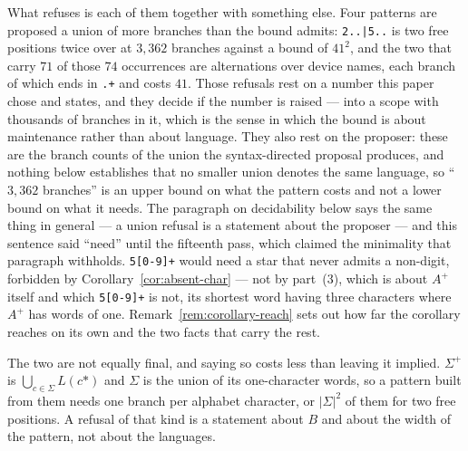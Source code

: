 What refuses is each of them together with something else. Four patterns are proposed a
union of more
branches than the bound admits: \texttt{2..|5..} is two free positions twice over at
$3{,}362$ branches against a bound of $41^{2}$, and the two that carry $71$ of those
$74$ occurrences are alternations over device names, each branch of which ends in
\texttt{.+} and costs $41$. Those refusals rest on a number this paper chose and states,
and they decide if the number is raised --- into a scope with thousands of branches in
it, which is the sense in which the bound is about maintenance rather than about
language. They also rest on the proposer: these are the branch counts of the union the
syntax-directed proposal produces, and nothing below establishes that no smaller union
denotes the same language, so ``$3{,}362$ branches'' is an upper bound on what the
pattern costs and not a lower bound on what it needs. The paragraph on decidability
below says the same thing in general --- a union refusal is a statement about the
proposer --- and this sentence said ``need'' until the fifteenth pass, which claimed the
minimality that paragraph withholds.
\texttt{5[0-9]+} would need a star that never admits a non-digit, forbidden by
Corollary~\ref{cor:absent-char} --- not by part~(3), which is about $A^{+}$ itself and
which \texttt{5[0-9]+} is not, its shortest word having three characters where $A^{+}$
has words of one. Remark~\ref{rem:corollary-reach} sets out how far the corollary
reaches on its own and the two facts that carry the rest.


\iffull\fi

The two are not equally final, and saying so costs less than leaving it implied.
$\Sigma^{+}$ is $\bigcup_{c\in\Sigma}L(c\texttt{*})$ and $\Sigma$ is the union of its
one-character words, so a pattern built from them needs one branch per alphabet
character, or $|\Sigma|^{2}$ of them for two free positions. A refusal of that kind is a
statement about $B$ and about the width of the pattern, not about the languages.

